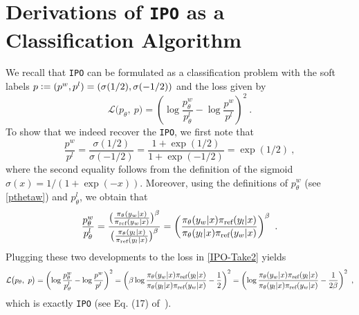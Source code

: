 \section{Derivations of \texttt{IPO} as a Classification Algorithm} 
\label{Appendix:IPO}

    We recall that \texttt{IPO} can be formulated as a classification problem with the soft labels $p \mathrel{\mathop:}= (p^{w}, p^{l}) = (\sigma(1/2) , \sigma(-1/2))$ and the loss given by
    \begin{equation} \label{IPO-Take2}
        \mathcal{L}\big(p_{\theta},\ p\big) = \left(\log\frac{p^{w}_{\theta}}{p^{l}_{\theta}} - \log\frac{p^{w}}{p^{l}}\right)^2\ .
    \end{equation}
    To show that we indeed recover the \texttt{IPO}, we first note that
    \begin{equation*}
        \frac{p^{w}}{p^{l}} = \frac{\sigma(1/2)}{\sigma(-1/2)} = \frac{1 + \exp(1/2)}{1 + \exp(-1/2)} = \exp(1/2)\ ,
    \end{equation*}
    where the second equality follows from the definition of the sigmoid $\sigma(x) = 1/(1 + \exp(-x))$. Moreover, using the definitions of $p^{w}_{\theta}$ (see \eqref{pthetaw}) and $p^{l}_{\theta}$, we obtain that 
    \begin{equation} \label{IPOfrac}
        \frac{p^{w}_{\theta}}{p^{l}_{\theta}} = \frac{\big(\frac{\pi_{\theta}(y_w \mid x)}{\pi_{\textrm{ref}}(y_w \mid x)}\big)^{\beta}}{\big(\frac{\pi_{\theta}(y_l \mid x)}{\pi_{\textrm{ref}}(y_l \mid x)}\big)^{\beta}} = \left(\frac{\pi_{\theta}(y_w | x)\pi_{\textrm{ref}}(y_l | x)}{\pi_{\theta}(y_l | x)\pi_{\textrm{ref}}(y_w | x)}\right)^{\beta}\ .
    \end{equation}
    Plugging these two developments to the loss in \eqref{IPO-Take2} yields
    \begin{equation*}
        \mathcal{L}\big(p_{\theta},\ p\big) = \left(\log\frac{p^{w}_{\theta}}{p^{l}_{\theta}} - \log\frac{p^{w}}{p^{l}}\right)^2 = \left(\beta\log \frac{\pi_{\theta}(y_w | x)\pi_{\textrm{ref}}(y_l | x)}{\pi_{\theta}(y_l | x)\pi_{\textrm{ref}}(y_w | x)} - \frac{1}{2}\right)^2 = \left(\log \frac{\pi_{\theta}(y_w | x)\pi_{\textrm{ref}}(y_l | x)}{\pi_{\theta}(y_l | x)\pi_{\textrm{ref}}(y_w | x)} - \frac{1}{2\beta}\right)^2\ ,
    \end{equation*} 
    which is exactly \texttt{IPO} (see Eq. (17) of~\citealt{IPO}).

